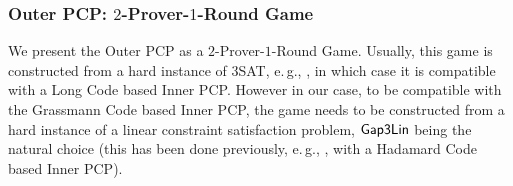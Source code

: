 \documentclass[11pt]{article}
\numberwithin{equation}{section}
\theoremstyle{definition}
\theoremstyle{plain}
\newcommand{\eg}{e.\,g.}
\begin{document}
%
\subsubsection{Outer PCP: \texorpdfstring{$2$-Prover-$1$-Round}{2-Prover-1-Round} Game}

We present the Outer PCP as a $2$-Prover-$1$-Round Game. Usually, this game is constructed from a hard instance of 3SAT, \eg, \cite{Has01, Has99},
in which case it is compatible with a Long Code based Inner PCP.
%
However in our case, to be compatible with the Grassmann Code
%
 based Inner PCP, the game needs to be constructed from a hard instance
 of a linear constraint satisfaction problem,
${\sf Gap3Lin}$ being the natural choice (this has been done previously, \eg,
\cite{KhotClique,KS}, with a Hadamard Code
%
based Inner PCP).
\end{document}
